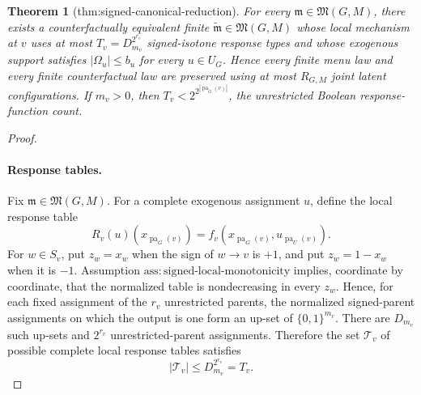 \documentclass{article}
\newtheorem{theorem}{Theorem}
\begin{document}
\begin{theorem}[thm:signed-canonical-reduction]\label{thm:signed-canonical-reduction}
For every \(\mathfrak m\in\mathfrak M(G,M)\), there exists a counterfactually equivalent finite \(\widetilde{\mathfrak m}\in\mathfrak M(G,M)\) whose local mechanism at \(v\) uses at most \(T_v=D_{m_v}^{2^{r_v}}\) signed-isotone response types and whose exogenous support satisfies \(|\Omega_u|\le b_u\) for every \(u\in U_G\). Hence every finite menu law and every finite counterfactual law are preserved using at most \(R_{G,M}\) joint latent configurations. If \(m_v>0\), then \(T_v<2^{2^{|\operatorname{pa}_G(v)|}}\), the unrestricted Boolean response-function count.
\end{theorem}
\begin{proof}
\paragraph{Response tables.}
Fix \(\mathfrak m\in\mathfrak M(G,M)\).  For a complete exogenous assignment \(u\), define the local response table
\[
 R_v(u)(x_{\operatorname{pa}_G(v)})
 =f_v(x_{\operatorname{pa}_G(v)},u_{\operatorname{pa}_U(v)}).
\]
For \(w\in S_v\), put \(z_w=x_w\) when the sign of \(w\to v\) is \(+1\), and put \(z_w=1-x_w\) when it is \(-1\).  Assumption \(\mathrm{ass:signed\text{-}local\text{-}monotonicity}\) implies, coordinate by coordinate, that the normalized table is nondecreasing in every \(z_w\).  Hence, for each fixed assignment of the \(r_v\) unrestricted parents, the normalized signed-parent assignments on which the output is one form an up-set of \(\{0,1\}^{m_v}\).  There are \(D_{m_v}\) such up-sets and \(2^{r_v}\) unrestricted-parent assignments.  Therefore the set \(\mathcal T_v\) of possible complete local response tables satisfies
\[
 |\mathcal T_v|\le D_{m_v}^{2^{r_v}}=T_v.
\]


\end{proof}
\end{document}
